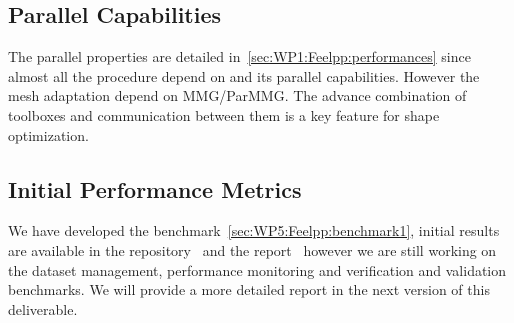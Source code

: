 \subsection{Parallel Capabilities}
\label{sec:WP5:Feelpp:performances}
 
The parallel properties are detailed in~\cref{sec:WP1:Feelpp:performances} since almost all the procedure depend on \Feelpp and its parallel capabilities.
However the mesh adaptation depend on MMG/ParMMG.
The advance combination of toolboxes and communication between them is a key feature for shape optimization. 

\subsection{Initial Performance Metrics}
\label{sec:WP5:Feelpp:metrics}

We have developed the benchmark~\cref{sec:WP5:Feelpp:benchmark1}, initial results are available in the repository~\cite{Palazollo_Feel_Shape_Optimization} and the report~\cite{palazzolo2023shape} however we are still working on the dataset management, performance monitoring and verification and validation benchmarks.
We will provide a more detailed report in the next version of this deliverable.

